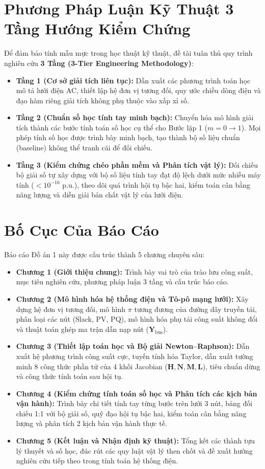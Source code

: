 \documentclass[12pt,a4paper,oneside]{report}
\begin{document}
\section{Phương Pháp Luận Kỹ Thuật 3 Tầng Hướng Kiểm Chứng}
Để đảm bảo tính mẫu mực trong học thuật kỹ thuật, đề tài tuân thủ quy trình nghiên cứu \textbf{3 Tầng (3-Tier Engineering Methodology)}:
\begin{itemize}
    \item \textbf{Tầng 1 (Cơ sở giải tích liên tục):} Dẫn xuất các phương trình toán học mô tả lưới điện AC, thiết lập hệ đơn vị tương đối, quy ước chiều dòng điện và đạo hàm riêng giải tích không phụ thuộc vào xấp xỉ số.
    \item \textbf{Tầng 2 (Chuẩn số học tính tay minh bạch):} Chuyển hóa mô hình giải tích thành các bước tính toán số học cụ thể cho Bước lặp 1 ($m = 0 \to 1$). Mọi phép tính số học được trình bày minh bạch, tạo thành bộ số liệu chuẩn (baseline) không thể tranh cãi để đối chiếu.
    \item \textbf{Tầng 3 (Kiểm chứng chéo phần mềm và Phân tích vật lý):} Đối chiếu bộ giải số tự xây dựng với bộ số liệu tính tay đạt độ lệch dưới mức nhiễu máy tính ($< 10^{-16}\text{ p.u.}$), theo dõi quá trình hội tụ bậc hai, kiểm toán cân bằng năng lượng và diễn giải bản chất vật lý của lưới điện.
\end{itemize}

\section{Bố Cục Của Báo Cáo}
Báo cáo Đồ án 1 này được cấu trúc thành 5 chương chuyên sâu:
\begin{itemize}
    \item \textbf{Chương 1 (Giới thiệu chung):} Trình bày vai trò của trào lưu công suất, mục tiêu nghiên cứu, phương pháp luận 3 tầng và cấu trúc báo cáo.
    \item \textbf{Chương 2 (Mô hình hóa hệ thống điện và Tô-pô mạng lưới):} Xây dựng hệ đơn vị tương đối, mô hình $\pi$ tương đương của đường dây truyền tải, phân loại các nút (Slack, PV, PQ), mô hình hóa phụ tải công suất không đổi và thuật toán ghép ma trận dẫn nạp nút ($\mathbf{Y}_{\text{bus}}$).
    \item \textbf{Chương 3 (Thiết lập toán học và Bộ giải Newton--Raphson):} Dẫn xuất hệ phương trình công suất cực, tuyến tính hóa Taylor, dẫn xuất tường minh 8 công thức phần tử của 4 khối Jacobian ($\mathbf{H}, \mathbf{N}, \mathbf{M}, \mathbf{L}$), tiêu chuẩn dừng và công thức tính toán sau hội tụ.
    \item \textbf{Chương 4 (Kiểm chứng tính toán số học và Phân tích các kịch bản vận hành):} Trình bày chi tiết tính tay từng bước trên lưới 3 nút, bảng đối chiếu 1:1 với bộ giải số, quỹ đạo hội tụ bậc hai, kiểm toán cân bằng năng lượng và phân tích 2 kịch bản vận hành thực tế.
    \item \textbf{Chương 5 (Kết luận và Nhận định kỹ thuật):} Tổng kết các thành tựu lý thuyết và số học, đúc rút các quy luật vật lý then chốt và đề xuất hướng nghiên cứu tiếp theo trong tính toán hệ thống điện.
\end{itemize}
\end{document}
